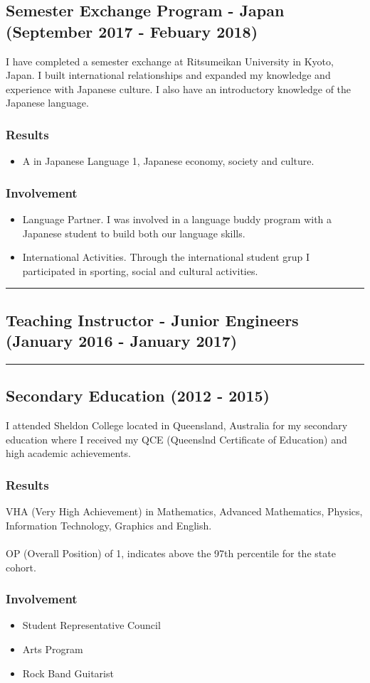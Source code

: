 \subsection*{Semester Exchange Program - Japan (September 2017 - Febuary 2018)}
I have completed a semester exchange at Ritsumeikan University in Kyoto, Japan. I built international relationships and expanded my knowledge and experience with Japanese culture. I also have an introductory knowledge of the Japanese language. 

\subsubsection*{Results}
\begin{itemize}
  \item A in Japanese Language 1, Japanese economy, society and culture.
\end{itemize}

\subsubsection*{Involvement}
\begin{itemize}
  \item Language Partner. I was involved in a language buddy program with a Japanese student to build both our language skills.
  \item International Activities. Through the international student grup I participated in sporting, social and cultural activities.
\end{itemize}

\noindent\rule{\textwidth}{0.5pt}

\subsection*{Teaching Instructor - Junior Engineers (January 2016 - January 2017)}

\noindent\rule{\textwidth}{0.5pt}

\subsection*{Secondary Education (2012 - 2015)}

I attended Sheldon College located in Queensland, Australia for my secondary education where I received my QCE (Queenslnd Certificate of Education) and high academic achievements.

\subsubsection*{Results}
VHA (Very High Achievement) in Mathematics, Advanced Mathematics, Physics, Information Technology, Graphics and English.\\
\\
OP (Overall Position) of 1, indicates above the 97th percentile for the state cohort.

\subsubsection*{Involvement}

\begin{itemize}
  \item Student Representative Council
  \item Arts Program
  \item Rock Band Guitarist
\end{itemize}

